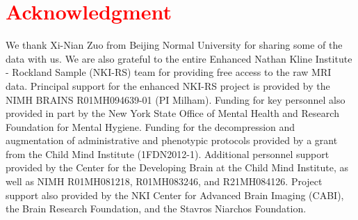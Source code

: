 \documentclass[11pt,letterpaper,english]{article}
\begin{document}
\section{\textcolor{red}{Acknowledgment}}
We thank Xi-Nian Zuo from Beijing Normal University for sharing some of the data with us. We are also grateful to the entire Enhanced Nathan Kline Institute - Rockland Sample (NKI-RS) team for providing free access to the raw MRI data. Principal support for the enhanced NKI-RS project is provided by the NIMH BRAINS R01MH094639-01 (PI Milham). Funding for key personnel also provided in part by the New York State Office of Mental Health and Research Foundation for Mental Hygiene. Funding for the decompression and augmentation of administrative and phenotypic protocols provided by a grant from the Child Mind Institute (1FDN2012-1). Additional personnel support provided by the Center for the Developing Brain at the Child Mind Institute, as well as NIMH R01MH081218, R01MH083246, and R21MH084126. Project support also provided by the NKI Center for Advanced Brain Imaging (CABI), the Brain Research Foundation, and the Stavros Niarchos Foundation.





\clearpage
\appendix

\end{document}
